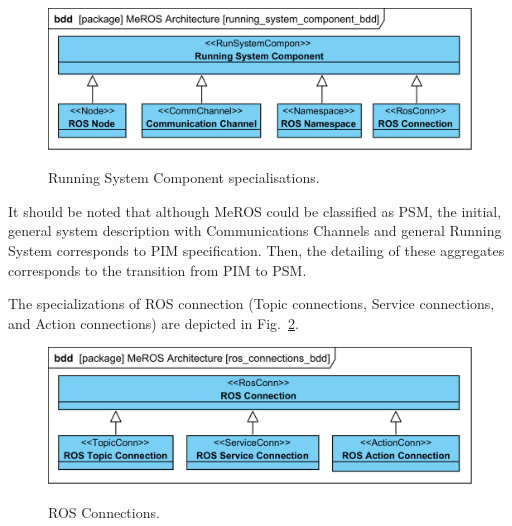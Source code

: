 \documentclass[11pt,oneside,a4paper]{report}
\begin{document}
	\begin{figure}[H]
		\centering
		\begin{center}
			{\includegraphics[scale=1.0]{diagrams/running_system_component_bdd.png}}
		\end{center}
		\caption{Running System Component specialisations.} 
		\label{fig:running_system_component_bdd}
	\end{figure} 
	 	 

	It should be noted that although MeROS could be classified as PSM, the initial, general system description with Communications Channels and general Running System corresponds to PIM specification. Then, the detailing of these aggregates corresponds to the transition from PIM to PSM. 
	
		
%
%
	
		 The specializations of ROS connection (Topic connections, Service connections, and Action connections) are depicted in Fig.~\ref{fig:ros_connections_bdd}. 
	
	
	\begin{figure}[H]
		\centering
		\begin{center}
			{\includegraphics[scale=1.0]{diagrams/ros_connections_bdd.png}}
		\end{center}
		\caption{ROS Connections.} 
		\label{fig:ros_connections_bdd}
	\end{figure}
\end{document}
